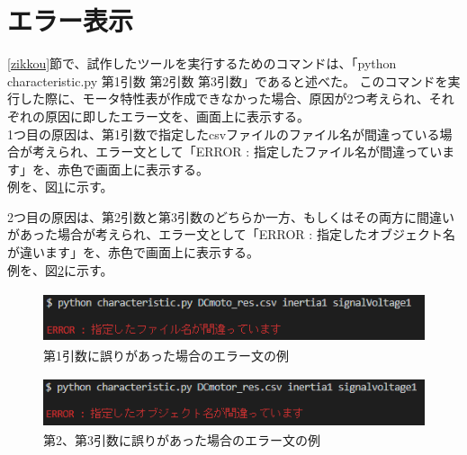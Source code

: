 \section{エラー表示}\label{error}
\ref{zikkou}節で、試作したツールを実行するためのコマンドは、「python characteristic.py 第1引数 第2引数 第3引数」であると述べた。
このコマンドを実行した際に、モータ特性表が作成できなかった場合、原因が2つ考えられ、それぞれの原因に即したエラー文を、画面上に表示する。\\
1つ目の原因は、第1引数で指定したcsvファイルのファイル名が間違っている場合が考えられ、エラー文として「ERROR : 指定したファイル名が間違っています」を、赤色で画面上に表示する。\\
例を、図\ref{fig:error_file}に示す。

2つ目の原因は、第2引数と第3引数のどちらか一方、もしくはその両方に間違いがあった場合が考えられ、エラー文として「ERROR : 指定したオブジェクト名が違います」を、赤色で画面上に表示する。\\
例を、図\ref{fig:error_comand}に示す。

\begin{figure}[t]
	\centering
	\includegraphics[width=12cm,height=1.5cm]{./Image/error_file.png}
	\caption{第1引数に誤りがあった場合のエラー文の例}
	\label{fig:error_file}
\end{figure}

\begin{figure}[t]
	\centering
	\includegraphics[width=12cm,height=1.5cm]{./Image/error_comand.png}
	\caption{第2、第3引数に誤りがあった場合のエラー文の例}
	\label{fig:error_comand}
\end{figure}
